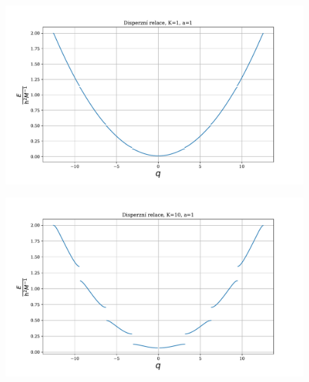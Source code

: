 \documentclass[10pt,a4paper]{article}
\begin{document}
\begin{figure}[p]
    \centering
    \includegraphics[scale=0.7]{disperzni1.pdf}
\end{figure}

\begin{figure}[p]
    \centering
    \includegraphics[scale=0.7]{disperzni10.pdf}
\end{figure}

\pagebreak
\end{document}
